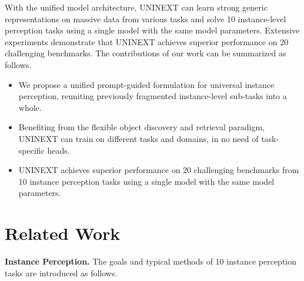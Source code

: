 \documentclass[10pt,twocolumn,letterpaper]{article}
\begin{document}
With the unified model architecture, UNINEXT can learn strong generic representations on massive data from various tasks and solve 10 instance-level perception tasks using a single model with the same model parameters. Extensive experiments demonstrate that UNINEXT achieves superior performance on 20 challenging benchmarks. The contributions of our work can be summarized as follows. 
\begin{itemize}
	\vspace{-1mm}
	\item{We propose a unified prompt-guided formulation for universal instance perception, reuniting previously fragmented instance-level sub-tasks into a whole.}
	\vspace{-1mm}
	\item{
	Benefiting from the flexible object discovery and retrieval paradigm, UNINEXT can train on different tasks and domains, in no need of task-specific heads.
	}
	\vspace{-1mm}
	\item{UNINEXT achieves superior performance on 20 challenging benchmarks from 10 instance perception tasks using a single model with the same model parameters.}
\end{itemize}


\section{Related Work}
\textbf{Instance Perception.} The goals and typical methods of 10 instance perception tasks are introduced as follows. 
\end{document}
